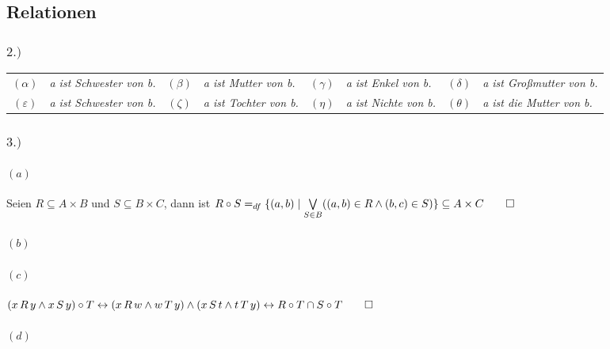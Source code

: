 \documentclass[titlepage]{article}
\newcommand{\1}{\mathbb{1}}
\newcommand{\0}{\mathbb{0}}
\begin{document}
	\subsection*{Relationen}
		\subsubsection*{$2.)$}
			\begin{table}[h]
				\begin{tabular}{clclclcl}
					$(\alpha)$&\textit{a ist Schwester von b.}&
					$(\beta)$&\textit{a ist Mutter von b.}&
					$(\gamma)$&\textit{a ist Enkel von b.}&
					$(\delta)$&\textit{a ist Großmutter von b.}\\
					$(\varepsilon)$&\textit{a ist Schwester von b.}&%
					$(\zeta)$&\textit{a ist Tochter von b.}&%
					$(\eta)$&\textit{a ist Nichte von b.}&
					$(\theta)$&\textit{a ist die Mutter von b.}%
				\end{tabular}
			\end{table}
		
		\subsubsection*{$3.)$}
			\paragraph{$(a)$}
				Seien $R\subseteq A\times B$ und $S\subseteq B\times C$, dann ist $R\circ S=_{df}\{(a,b)\mid\underset{S\in B}{\bigvee}((a,b)\in R\land(b,c)\in S)\}\subseteq A\times C\qed$
			\paragraph{$(b)$}\scalebox{1}{
				$x\,(R\circ S)\circ T\,y\leftrightarrow x\,R\circ S\,k\land k\,T\,y\leftrightarrow x\,R\,f\land f\,S\,k\land k\,T\,y\leftrightarrow x\,R\,f\land f\,S\circ T\,y\leftrightarrow x\,R\circ (S\circ T)\,y$\qed}
			\paragraph{$(c)$}
				$(x\,R\,y\land x\,S\,y)\circ T\leftrightarrow (x\,R\,w\land w\,T\,y)\land(x\,S\,t\land t\,T\,y)\leftrightarrow R\circ T\cap S\circ T\qed$
				
				
			\paragraph{$(d)$}
\end{document}
